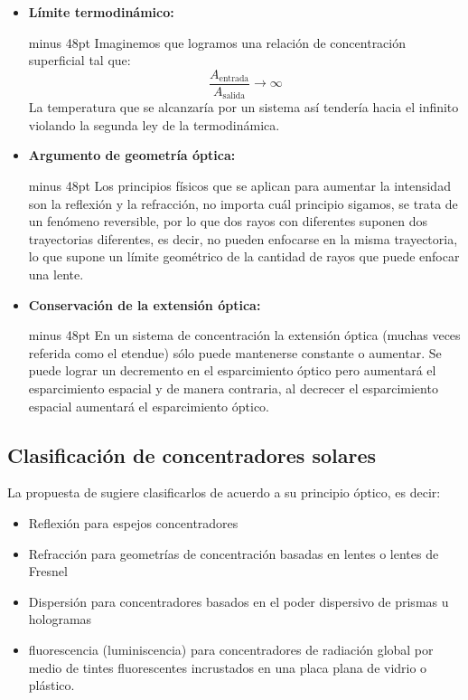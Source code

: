 		\begin{itemize}
			\item \textbf{Límite termodinámico:}\par
				\begin{rightbox}{\linewidth minus 48pt}
					Imaginemos que logramos una relación de concentración superficial tal que:
					\begin{equation*}
						\dfrac{A_{\text{entrada}}}{A_{\text{salida}}} \rightarrow \infty
					\end{equation*}
					La temperatura que se alcanzaría por un sistema así tendería hacia el infinito violando la segunda ley de la termodinámica.
				\end{rightbox}
			\item \textbf{Argumento de geometría óptica:}
				\begin{rightbox}{\linewidth minus 48pt}
					Los principios físicos que se aplican para aumentar la intensidad son la reflexión y la refracción, no importa cuál principio sigamos, se trata de un fenómeno reversible, por lo que dos rayos con diferentes suponen dos trayectorias diferentes, es decir, no pueden enfocarse en la misma trayectoria, lo que supone un límite geométrico de la cantidad de rayos que puede enfocar una lente.
				\end{rightbox}
			\item \textbf{Conservación de la extensión óptica:}
				\begin{rightbox}{\linewidth minus 48pt}
					En un sistema de concentración la extensión óptica (muchas veces referida como el \gls{etendue}) sólo puede mantenerse constante o aumentar. Se puede lograr un decremento en el esparcimiento óptico pero aumentará el esparcimiento espacial y de manera contraria, al decrecer el esparcimiento espacial aumentará el esparcimiento óptico.
				\end{rightbox}
		\end{itemize}
		
	\subsection{Clasificación de concentradores solares}
	
		La propuesta de \cite{leutz_nonimaging_2001} sugiere clasificarlos de acuerdo a su principio óptico, es decir:

		\begin{itemize}
			\item Reflexión para espejos concentradores
			\item Refracción para geometrías de concentración basadas en lentes o lentes de Fresnel
			\item Dispersión para concentradores basados en el poder dispersivo de prismas u hologramas
			\item \Gls{fluorescencia} (\gls{luminiscencia}) para concentradores de radiación global por medio de tintes fluorescentes incrustados en una placa plana de vidrio o plástico.
		\end{itemize}

